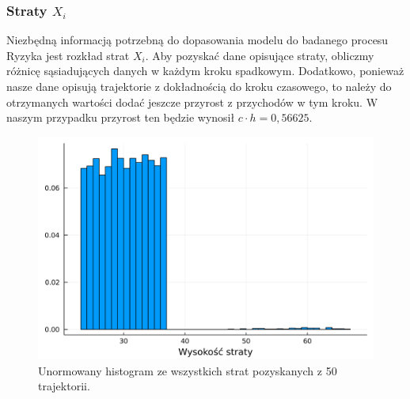 \documentclass[12pt]{mwart}
\begin{document}
	\subsubsection{Straty {\boldmath $X_i$}}
	\noindent Niezbędną informacją potrzebną do dopasowania modelu do badanego procesu Ryzyka jest rozkład strat $X_i$. Aby pozyskać dane opisujące straty, obliczmy różnicę sąsiadujących danych w każdym kroku spadkowym. Dodatkowo, ponieważ nasze dane opisują trajektorie z dokładnością do kroku czasowego, to należy do otrzymanych wartości dodać jeszcze przyrost z przychodów w tym kroku. W naszym przypadku przyrost ten będzie wynosił $c \cdot h = 0,56625$.
	
	\begin{figure}[H]
		\centering
		\includegraphics[width=\columnwidth]{fig/straty_1.pdf}
		\caption{Unormowany histogram ze wszystkich strat pozyskanych z 50 trajektorii.}
	\end{figure}
\end{document}
